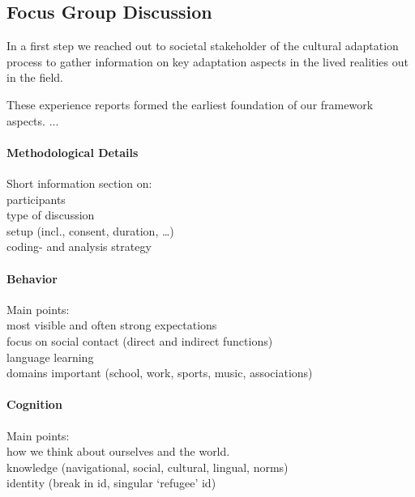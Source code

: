 \documentclass[nobib]{tufte-handout}
\begin{document}
\subsection{Focus Group Discussion}
In a first step we reached out to societal stakeholder of the cultural adaptation process to gather information on key adaptation aspects in the lived realities out in the field.

These experience reports formed the earliest foundation of our framework aspects. ...

\paragraph{Methodological Details} Short information section on: \\
participants\\
type of discussion\\
setup (incl., consent, duration, …)\\
coding- and analysis strategy

\paragraph{Behavior} Main points:\\
most visible and often strong expectations\\
focus on social contact (direct and indirect functions) \\
language learning \\
domains important (school, work, sports, music, associations) \\

\paragraph{Cognition} Main points:\\
how we think about ourselves and the world.\\
knowledge (navigational, social, cultural, lingual, norms)\\
identity (break in id, singular ‘refugee' id)\\
\end{document}
